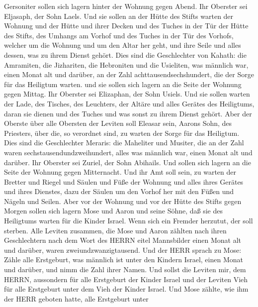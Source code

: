 Gersoniter sollen sich lagern hinter der Wohnung gegen Abend.
 Ihr Oberster sei Eljasaph, der Sohn Laels. 
Und sie sollen an der Hütte des Stifts warten der Wohnung und der Hütte
und ihrer Decken und des Tuches in der Tür der Hütte des Stifts,
 des Umhangs am Vorhof und des Tuches in der Tür des
Vorhofs, welcher um die Wohnung und um den Altar her geht, und ihre
Seile und alles dessen, was zu ihrem Dienst gehört.  Dies
sind die Geschlechter von Kahath: die Amramiten, die Jizhariten, die
Hebroniten und die Usieliten,  was männlich war, einen
Monat alt und darüber, an der Zahl achttausendsechshundert, die der
Sorge für das Heiligtum warten.  und sie sollen sich lagern
an die Seite der Wohnung gegen Mittag.  Ihr Oberster sei
Elizaphan, der Sohn Usiels.  Und sie sollen warten der
Lade, des Tisches, des Leuchters, der Altäre und alles Gerätes des
Heiligtums, daran sie dienen und des Tuches und was sonst zu ihrem
Dienst gehört.  Aber der Oberste über alle Obersten der
Leviten soll Eleasar sein, Aarons Sohn, des Priesters, über die, so
verordnet sind, zu warten der Sorge für das Heiligtum. 
Dies sind die Geschlechter Meraris: die Maheliter und Musiter,
 die an der Zahl waren sechstausendundzweihundert, alles
was männlich war, einen Monat alt und darüber.  Ihr
Oberster sei Zuriel, der Sohn Abihails. Und sollen sich lagern an die
Seite der Wohnung gegen Mitternacht.  Und ihr Amt soll
sein, zu warten der Bretter und Riegel und Säulen und Füße der Wohnung
und alles ihres Gerätes und ihres Dienstes,  dazu der
Säulen um den Vorhof her mit den Füßen und Nägeln und Seilen.
 Aber vor der Wohnung und vor der Hütte des Stifts gegen
Morgen sollen sich lagern Mose und Aaron und seine Söhne, daß sie des
Heiligtums warten für die Kinder Israel. Wenn sich ein Fremder herzutut,
der soll sterben.  Alle Leviten zusammen, die Mose und
Aaron zählten nach ihren Geschlechtern nach dem Wort des HERRN eitel
Mannsbilder einen Monat alt und darüber, waren zweiundzwanzigtausend.
 Und der HERR sprach zu Mose: Zähle alle Erstgeburt, was
männlich ist unter den Kindern Israel, einen Monat und darüber, und nimm
die Zahl ihrer Namen.  Und sollst die Leviten mir, dem
HERRN, aussondern für alle Erstgeburt der Kinder Israel und der Leviten
Vieh für alle Erstgeburt unter dem Vieh der Kinder Israel. 
Und Mose zählte, wie ihm der HERR geboten hatte, alle Erstgeburt unter
